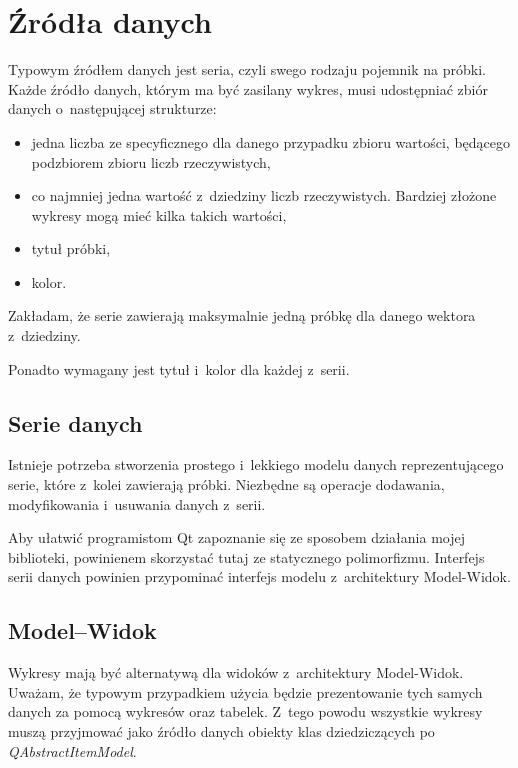\section{Źródła danych}
Typowym źródłem danych jest seria, czyli swego rodzaju pojemnik na próbki. Każde źródło danych, którym ma być zasilany wykres, musi udostępniać zbiór danych o~następującej strukturze:

\begin{itemize}
\item{jedna liczba ze specyficznego dla danego przypadku zbioru wartości, będącego podzbiorem zbioru liczb rzeczywistych,}
\item{co najmniej jedna wartość z~dziedziny liczb rzeczywistych. Bardziej złożone wykresy mogą mieć kilka takich wartości,}
\item{tytuł próbki,}
\item{kolor.}
\end{itemize}

Zakładam, że serie zawierają maksymalnie jedną próbkę dla danego wektora z~dziedziny. 

Ponadto wymagany jest tytuł i~kolor dla każdej z~serii.


\subsection{Serie danych}
Istnieje potrzeba stworzenia prostego i~lekkiego modelu danych reprezentującego serie, które z~kolei zawierają próbki. Niezbędne są operacje dodawania, modyfikowania i~usuwania danych z~serii. 

Aby ułatwić programistom Qt zapoznanie się ze sposobem działania mojej biblioteki, powinienem skorzystać tutaj ze statycznego polimorfizmu. Interfejs serii danych powinien przypominać interfejs modelu z~architektury Model-Widok.

\subsection{Model--Widok}
Wykresy mają być alternatywą dla widoków z~architektury Model-Widok. Uważam, że typowym przypadkiem użycia będzie prezentowanie tych samych danych za pomocą wykresów oraz tabelek. Z~tego powodu wszystkie wykresy muszą przyjmować jako źródło danych obiekty klas dziedziczących po \textit{QAbstractItemModel}.


